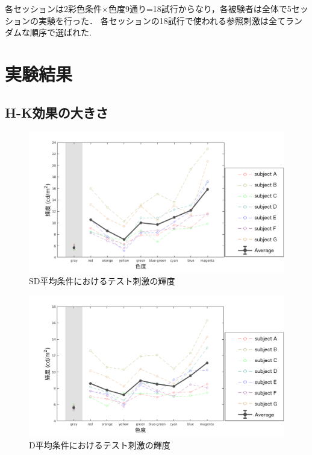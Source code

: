             各セッションは2彩色条件$\times$色度9通り=18試行からなり，各被験者は全体で5セッションの実験を行った．
            各セッションの18試行で使われる参照刺激は全てランダムな順序で選ばれた.

    \section{実験結果}

        \subsection{H-K効果の大きさ}

            \begin{figure}[h]
                \centering
                \includegraphics[width=14.0cm]{./img/ex2_res_SD_p.png}
                \caption{SD平均条件におけるテスト刺激の輝度}
                \label{ex2_SD}
            \end{figure}

            \begin{figure}[h]
                \centering
                \includegraphics[width=14.0cm]{./img/ex2_res_D_p.png}
                \caption{D平均条件におけるテスト刺激の輝度}
                \label{ex2_D}
            \end{figure}


